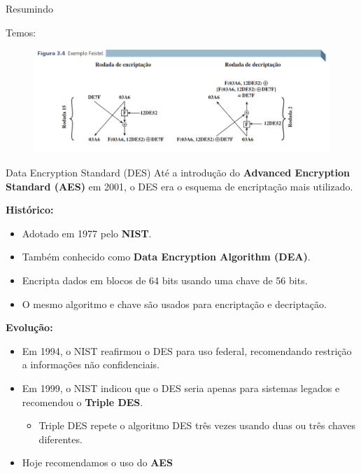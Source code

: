 \begin{frame}{Resumindo}

Temos:
\begin{figure}
    \centering
    \includegraphics[width=0.9\linewidth]{Figuras/feistel-resumo-livro.png}

\end{figure}



\end{frame}

\begin{frame}{Data Encryption Standard (DES)}
    Até a introdução do \textbf{Advanced Encryption Standard (AES)} em 2001, o DES era o esquema de encriptação mais utilizado.

    \vspace{0.3cm}
    \textbf{Histórico:}
    \begin{itemize}
        \item Adotado em 1977 pelo \textbf{NIST}.
        \item Também conhecido como \textbf{Data Encryption Algorithm (DEA)}.
        \item Encripta dados em blocos de 64 bits usando uma chave de 56 bits.
        \item O mesmo algoritmo e chave são usados para encriptação e decriptação.
    \end{itemize}

    \vspace{0.3cm}
    \textbf{Evolução:}
    \begin{itemize}
        \item Em 1994, o NIST reafirmou o DES para uso federal, recomendando restrição a informações não confidenciais.
        \item Em 1999, o NIST indicou que o DES seria apenas para sistemas legados e recomendou o \textbf{Triple DES}.
        \begin{itemize}
            \item Triple DES repete o algoritmo DES três vezes usando duas ou três chaves diferentes. 
        \end{itemize}
        \item Hoje recomendamos o uso do \textbf{AES}
    \end{itemize}


\end{frame}

